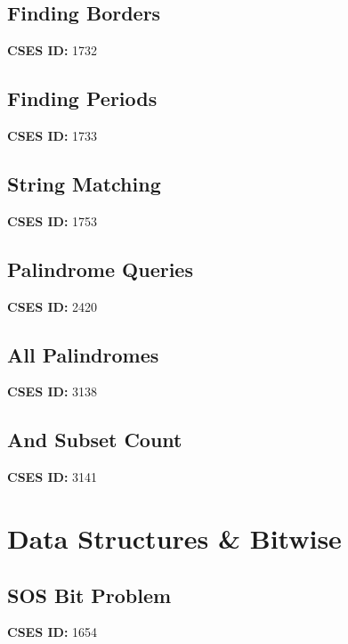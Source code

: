 \documentclass[10pt, a4paper, twocolumn, landscape]{article}
\begin{document}
\subsection{Finding Borders}
\textbf{CSES ID:} 1732 \\

\vspace{0.2cm}
\subsection{Finding Periods}
\textbf{CSES ID:} 1733 \\

\vspace{0.2cm}
\subsection{String Matching}
\textbf{CSES ID:} 1753 \\

\vspace{0.2cm}
\subsection{Palindrome Queries}
\textbf{CSES ID:} 2420 \\

\vspace{0.2cm}
\subsection{All Palindromes}
\textbf{CSES ID:} 3138 \\

\vspace{0.2cm}
\subsection{And Subset Count}
\textbf{CSES ID:} 3141 \\

\vspace{0.2cm}
\section{Data Structures \& Bitwise}
\subsection{SOS Bit Problem}
\textbf{CSES ID:} 1654 \\

\vspace{0.2cm}
\end{document}
